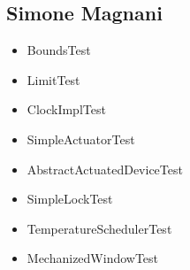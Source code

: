 \subsection{Simone Magnani}
\begin{itemize}
	\item BoundsTest
	\item LimitTest
	\item ClockImplTest
	\item SimpleActuatorTest
	\item AbstractActuatedDeviceTest
	\item SimpleLockTest
	\item TemperatureSchedulerTest
	\item MechanizedWindowTest
\end{itemize}
